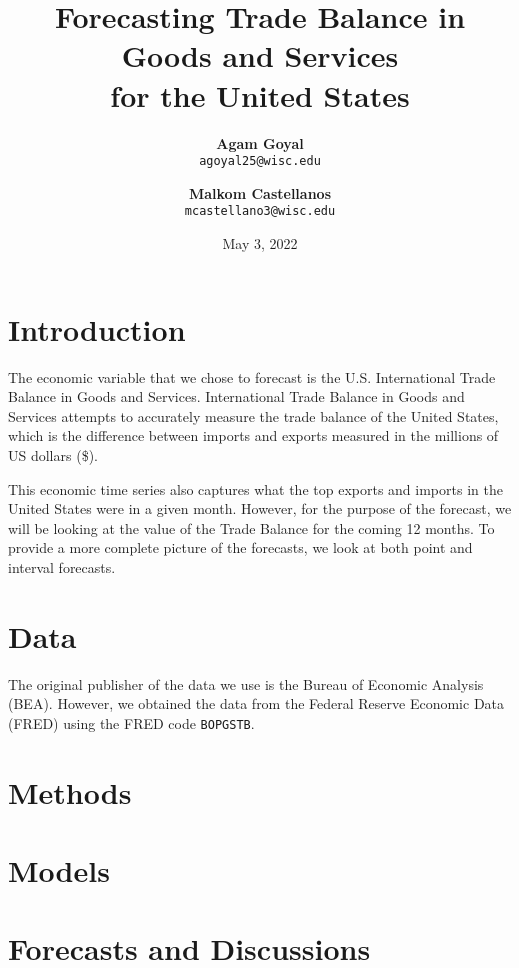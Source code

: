 \documentclass[12pt]{article}
\title{\vspace{-3cm}Forecasting Trade Balance in Goods and Services\\ for the United States}
\author{
  \textbf{Agam Goyal}\\
  \texttt{agoyal25@wisc.edu}
  \and
  \textbf{Malkom Castellanos}\\
  \texttt{mcastellano3@wisc.edu}
}
\date{May 3, 2022}
\begin{document}
\maketitle

\section{Introduction}

The economic variable that we chose to forecast is the U.S. International Trade Balance in Goods and Services. International Trade Balance in Goods and Services attempts to accurately measure the trade balance of the United States, which is the difference between imports and exports measured in the millions of US dollars (\$). 

This economic time series also captures what the top exports and imports in the United States were in a given month. However, for the purpose of the forecast, we will be looking at the value of the Trade Balance for the coming 12 months. To provide a more complete picture of the forecasts, we look at both point and interval forecasts.

\section{Data}

The original publisher of the data we use is the Bureau of Economic Analysis (BEA). However, we obtained the data from the Federal Reserve Economic Data (FRED)\cite{data} using the FRED code \texttt{BOPGSTB}.

\section{Methods}

\section{Models}

\section{Forecasts and Discussions}

\begin{center}
        \printbibliography %
\end{center}

\end{document}
